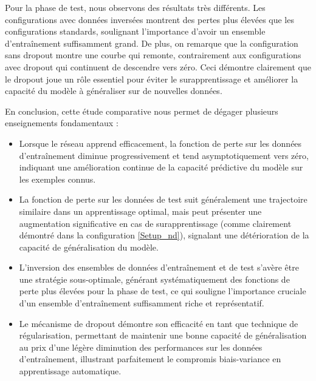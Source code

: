 Pour la phase de test, nous observons des résultats très différents. Les configurations avec données inversées montrent des pertes plus élevées que les configurations standards, soulignant l'importance d'avoir un ensemble d'entraînement suffisamment grand. De plus, on remarque que la configuration sans dropout montre une courbe qui remonte, contrairement aux configurations avec dropout qui continuent de descendre vers zéro. Ceci démontre clairement que le dropout joue un rôle essentiel pour éviter le surapprentissage et améliorer la capacité du modèle à généraliser sur de nouvelles données.

En conclusion, cette étude comparative nous permet de dégager plusieurs enseignements fondamentaux :

\begin{itemize}
    \item Lorsque le réseau apprend efficacement, la fonction de perte sur les données d'entraînement diminue progressivement et tend asymptotiquement vers zéro, indiquant une amélioration continue de la capacité prédictive du modèle sur les exemples connus.
    \item La fonction de perte sur les données de test suit généralement une trajectoire similaire dans un apprentissage optimal, mais peut présenter une augmentation significative en cas de surapprentissage (comme clairement démontré dans la configuration \ref{Setup_nd}), signalant une détérioration de la capacité de généralisation du modèle.
    \item L'inversion des ensembles de données d'entraînement et de test s'avère être une stratégie sous-optimale, générant systématiquement des fonctions de perte plus élevées pour la phase de test, ce qui souligne l'importance cruciale d'un ensemble d'entraînement suffisamment riche et représentatif.
    \item Le mécanisme de dropout démontre son efficacité en tant que technique de régularisation, permettant de maintenir une bonne capacité de généralisation au prix d'une légère diminution des performances sur les données d'entraînement, illustrant parfaitement le compromis biais-variance en apprentissage automatique.
\end{itemize}